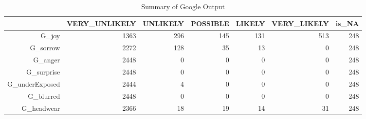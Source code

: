 \begin{table}[ht]
\centering
\begin{tabular}{rrrrrrr}
  \hline
 & VERY\_UNLIKELY & UNLIKELY & POSSIBLE & LIKELY & VERY\_LIKELY & is\_NA \\ 
  \hline
G\_joy & 1363 & 296 & 145 & 131 & 513 & 248 \\ 
  G\_sorrow & 2272 & 128 & 35 & 13 & 0 & 248 \\ 
  G\_anger & 2448 & 0 & 0 & 0 & 0 & 248 \\ 
  G\_surprise & 2448 & 0 & 0 & 0 & 0 & 248 \\ 
  G\_underExposed & 2444 & 4 & 0 & 0 & 0 & 248 \\ 
  G\_blurred & 2448 & 0 & 0 & 0 & 0 & 248 \\ 
  G\_headwear & 2366 & 18 & 19 & 14 & 31 & 248 \\ 
   \hline
\end{tabular}
\caption{Summary of Google Output} 
\label{Tab:Img_Google}
\end{table}
